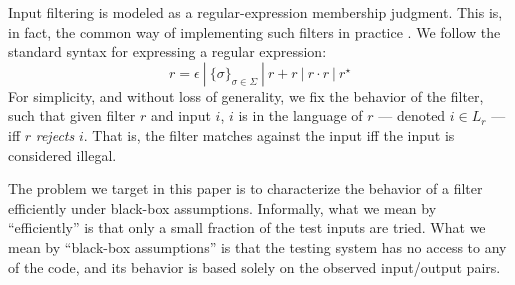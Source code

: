 Input filtering is modeled as a regular-expression membership judgment. This is, in fact, the common way of implementing such filters in practice \cite{XXX}. We follow the standard syntax for expressing a regular expression:
$$
	r = \epsilon\ |\ \{ \sigma \}_{\sigma \in \Sigma}\ |\ r + r\ |\ r \cdot r\ |\ r^{\star}
$$
For simplicity, and without loss of generality, we fix the behavior of the filter, such that given filter $r$ and input $i$, $i$ is in the language of $r$ --- denoted $i \in L_r$ --- iff $r$ \emph{rejects} $i$. That is, the filter matches against the input iff the input is considered illegal.

The problem we target in this paper is to characterize the behavior of a filter efficiently under black-box assumptions. Informally, what we mean by ``efficiently'' is that only a small fraction of the test inputs are tried. What we mean by ``black-box assumptions'' is that the testing system has no access to any of the code, and its behavior is based solely on the observed input/output pairs.



